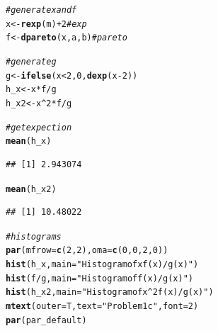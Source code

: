 \documentclass{article}\usepackage[]{graphicx}\usepackage[]{color}
\makeatletter
\newcommand{\hlnum}[1]{\textcolor[rgb]{0.686,0.059,0.569}{#1}}%
\newcommand{\hlstr}[1]{\textcolor[rgb]{0.192,0.494,0.8}{#1}}%
\newcommand{\hlcom}[1]{\textcolor[rgb]{0.678,0.584,0.686}{\textit{#1}}}%
\newcommand{\hlopt}[1]{\textcolor[rgb]{0,0,0}{#1}}%
\newcommand{\hlstd}[1]{\textcolor[rgb]{0.345,0.345,0.345}{#1}}%
\newcommand{\hlkwb}[1]{\textcolor[rgb]{0.69,0.353,0.396}{#1}}%
\newcommand{\hlkwc}[1]{\textcolor[rgb]{0.333,0.667,0.333}{#1}}%
\newcommand{\hlkwd}[1]{\textcolor[rgb]{0.737,0.353,0.396}{\textbf{#1}}}%
\newenvironment{kframe}{%
 \def\at@end@of@kframe{}%
 \ifinner\ifhmode%
  \def\at@end@of@kframe{\end{minipage}}%
  \begin{minipage}{\columnwidth}%
 \fi\fi%
 \def\FrameCommand##1{\hskip\@totalleftmargin \hskip-\fboxsep
 \colorbox{shadecolor}{##1}\hskip-\fboxsep
     \hskip-\linewidth \hskip-\@totalleftmargin \hskip\columnwidth}%
 \MakeFramed {\advance\hsize-\width
   \@totalleftmargin\z@ \linewidth\hsize
   \@setminipage}}%
 {\par\unskip\endMakeFramed%
 \at@end@of@kframe}
\newenvironment{knitrout}{}{} %
\makeatother
\begin{document}
\begin{knitrout}
\color{fgcolor}\begin{kframe}
\begin{alltt}
\hlcom{#generate x and f}
\hlstd{x} \hlkwb{<-} \hlkwd{rexp}\hlstd{(m)}\hlopt{+}\hlnum{2} \hlcom{#exp}
\hlstd{f} \hlkwb{<-} \hlkwd{dpareto}\hlstd{(x, a, b)} \hlcom{#pareto}

\hlcom{#generate g}
\hlstd{g} \hlkwb{<-} \hlkwd{ifelse}\hlstd{(x}\hlopt{<}\hlnum{2}\hlstd{,} \hlnum{0}\hlstd{,} \hlkwd{dexp}\hlstd{(x}\hlopt{-}\hlnum{2}\hlstd{))}
\hlstd{h_x} \hlkwb{<-} \hlstd{x}\hlopt{*}\hlstd{f}\hlopt{/}\hlstd{g}
\hlstd{h_x2} \hlkwb{<-} \hlstd{x}\hlopt{^}\hlnum{2}\hlopt{*}\hlstd{f}\hlopt{/}\hlstd{g}

\hlcom{#get expection}
\hlkwd{mean}\hlstd{(h_x)}
\end{alltt}
\begin{verbatim}
## [1] 2.943074
\end{verbatim}
\begin{alltt}
\hlkwd{mean}\hlstd{(h_x2)}
\end{alltt}
\begin{verbatim}
## [1] 10.48022
\end{verbatim}
\begin{alltt}
\hlcom{#histograms}
\hlkwd{par}\hlstd{(}\hlkwc{mfrow} \hlstd{=} \hlkwd{c}\hlstd{(}\hlnum{2}\hlstd{,} \hlnum{2}\hlstd{),} \hlkwc{oma} \hlstd{=} \hlkwd{c}\hlstd{(}\hlnum{0}\hlstd{,} \hlnum{0}\hlstd{,} \hlnum{2}\hlstd{,} \hlnum{0}\hlstd{))}
\hlkwd{hist}\hlstd{(h_x,} \hlkwc{main} \hlstd{=} \hlstr{"Histogram of x f(x) / g(x)"}\hlstd{)}
\hlkwd{hist}\hlstd{(f} \hlopt{/} \hlstd{g,} \hlkwc{main} \hlstd{=} \hlstr{"Histogram of f(x)/g(x)"}\hlstd{)}
\hlkwd{hist}\hlstd{(h_x2,} \hlkwc{main} \hlstd{=} \hlstr{"Histogram of x^2 f(x) / g(x)"}\hlstd{)}
\hlkwd{mtext}\hlstd{(}\hlkwc{outer} \hlstd{= T,} \hlkwc{text} \hlstd{=} \hlstr{"Problem 1c"}\hlstd{,} \hlkwc{font} \hlstd{=} \hlnum{2}\hlstd{)}
\hlkwd{par}\hlstd{(par_default)}
\end{alltt}
\end{kframe}

\end{knitrout}
\end{document}
